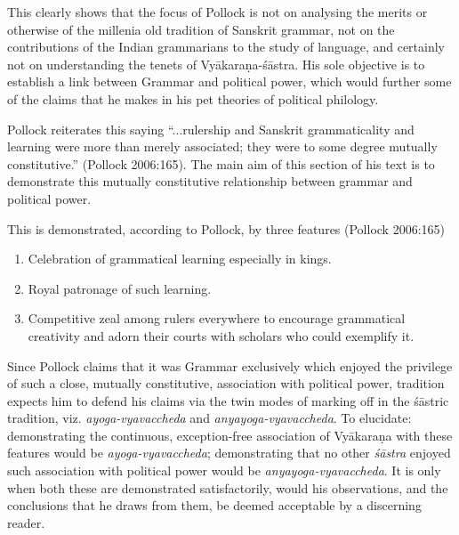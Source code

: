 This clearly shows that the focus of Pollock is not on analysing the merits or otherwise of the millenia old tradition of Sanskrit grammar, not on the contributions of the Indian grammarians to the study of language, and certainly not on understanding the tenets of Vyākaraṇa-śāstra. His sole objective is to establish a link between Grammar and political power, which would further some of the claims that he makes in his pet theories of political philology.

Pollock reiterates this saying ``...rulership and Sanskrit grammaticality and learning were more than merely associated; they were to some degree mutually constitutive.'' (Pollock 2006:165). The main aim of this section of his text is to demonstrate this mutually constitutive relationship between grammar and political power.

This is demonstrated, according to Pollock, by three features (Pollock 2006:165)
\begin{enumerate}
\item Celebration of grammatical learning especially in kings.
\item Royal patronage of such learning.
\item Competitive zeal among rulers everywhere to encourage grammatical creativity and adorn their courts with scholars who could exemplify it. 
\end{enumerate}

Since Pollock claims that it was Grammar exclusively which enjoyed the privilege of such a close, mutually constitutive, association with political power, tradition expects him to defend his claims via the twin modes of marking off in the śāstric tradition, viz. {\sl ayoga-vyavaccheda} and {\sl anyayoga-vyavaccheda}. To elucidate: demonstrating the continuous, exception-free association of Vyākaraṇa with these features would be {\sl ayoga-vyavaccheda}; demonstrating that no other {\sl śāstra} enjoyed such association with political power would be {\sl anyayoga-vyavaccheda}. It is only when both these are demonstrated satisfactorily, would his observations, and the conclusions that he draws from them, be deemed acceptable by a discerning reader. 

